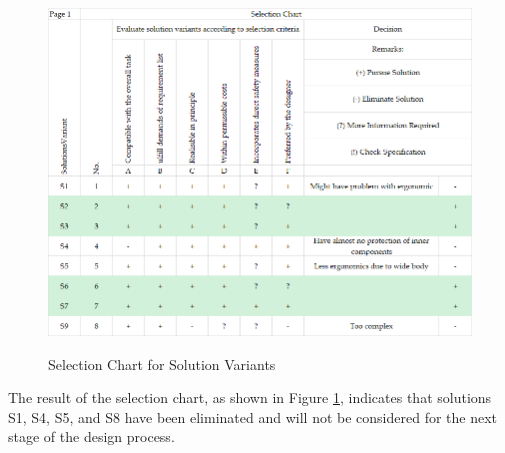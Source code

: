 \begin{figure}[ht!]
    \centering
    {\includegraphics[width=\linewidth]{texs/Part1/chapter3/image/selchart2.png}}
    \caption{Selection Chart for Solution Variants}
    \label{fig:selection-chart-solution-variants}
\end{figure}

The result of the selection chart, as shown in Figure \ref{fig:selection-chart-solution-variants}, indicates that solutions S1, S4, S5, and S8 have been eliminated and will not be considered for the next stage of the design process.

